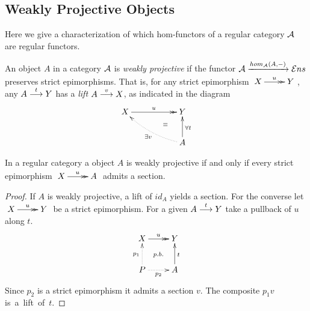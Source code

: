 \subsection{Weakly Projective Objects}
Here we give a characterization of which hom-functors of a regular category $\mathcal{A}$ are regular functors.

\begin{definition}
An object $A$ in a category $\mathcal{A}$ is \emph{weakly projective} if the functor $\mathcal{A} \xrightarrow{hom_{\mathcal{A}}(A,-)} \mathcal{E}ns$ 
preserves strict epimorphisms. That is, for any strict epimorphism 
$\xymatrix{X \ar@{->>}[r]^{u} &  Y}$, any $A \overset {t} {\longrightarrow} Y$ has a 
\emph{lift} $A \overset {v} {\longrightarrow} X$, as indicated in the diagram 
$$
\xymatrix
     {
      X \ar@{->>}[rr]^{u} 
   && Y 
   \\ 
   && A \ar[u]_{\forall t}
        \ar@/^/@{.>}[ull]^{\exists v} 
        \ar@{}[ul]|(.6){\equiv}}
$$
\end{definition}


\begin{remark}
In a regular category a object $A$ is weakly projective if and only if every strict epimorphism $\xymatrix{X \ar@{->>}[r]^{u} & A}$ admits a section.
\end{remark}
\begin{proof}
If $A$ is weakly projective, a lift of $id_A$  yields a section. For the converse let $\xymatrix{X \ar@{->>}[r]^{u} & Y}$ be a strict epimorphism. For a given $A \overset {t} {\longrightarrow} Y$ take a pullback of $u$ along $t$.
$$
\xymatrix{X \ar@{->>}[r]^{u} \ar@{}[rd]|{p.b.} & Y \\ P \ar@{.>}[u]^{p_1} \ar@{.>}[r]_{p_2} & A \ar[u]_t}
$$
Since $p_2$ is a strict epimorphism it admits a section $v$. The composite 
$p_1 v$ \mbox{is a lift of $t$.}
\end{proof} 
